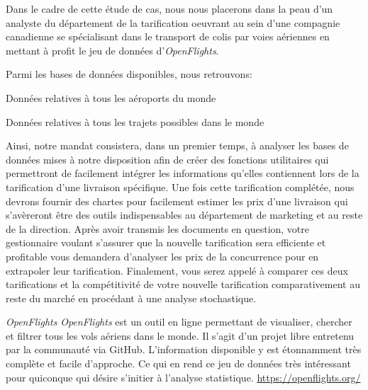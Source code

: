 Dans le cadre de cette étude de cas, nous nous placerons dans la peau d'un analyste du département de la tarification oeuvrant au sein d'une compagnie canadienne se spécialisant dans le transport de colis par voies aériennes en mettant à profit le jeu de données d'\emph{OpenFlights}. \cite{OpenFlightsData} 


Parmi les bases de données disponibles, nous retrouvons: \\

\begin{description}[style=multiline,leftmargin=2.5cm]
	\item[airports.dat] Données relatives à tous les aéroports du monde \cite{Data:RouteWorlwide}
	\item[routes.dat] Données relatives à tous les trajets possibles dans le monde \cite{Data:AirportWorlwide}
\end{description}

\vspace{\baselineskip}
Ainsi, notre mandat consistera, dans un premier temps, à analyser les bases de données mises à notre disposition afin de créer des fonctions utilitaires qui permettront de facilement intégrer les informations qu'elles contiennent lors de la tarification d'une livraison spécifique. Une fois cette tarification complétée, nous devrons fournir des chartes pour facilement estimer les prix d'une livraison qui s'avèreront être des outils indispensables au département de marketing et au reste de la direction. Après avoir transmis les documents en question, votre gestionnaire voulant s'assurer que la nouvelle tarification sera efficiente et profitable vous demandera d'analyser les prix de la concurrence pour en extrapoler leur tarification. Finalement, vous serez appelé à comparer ces deux tarifications et la compétitivité de votre nouvelle tarification comparativement au reste du marché en procédant à une analyse stochastique. \\

\begin{moreInfo}{\emph{OpenFlights}}
	\emph{OpenFlights} est un outil en ligne permettant de visualiser, chercher et filtrer tous les vols aériens dans le monde. Il s’agit d’un projet libre entretenu par la communauté via GitHub. \cite{GitHub} L’information disponible y est étonnamment très complète et facile d’approche. Ce qui en rend ce jeu de données très intéressant pour quiconque qui désire s’initier à l’analyse statistique.
	\url{https://openflights.org/}
\end{moreInfo}

